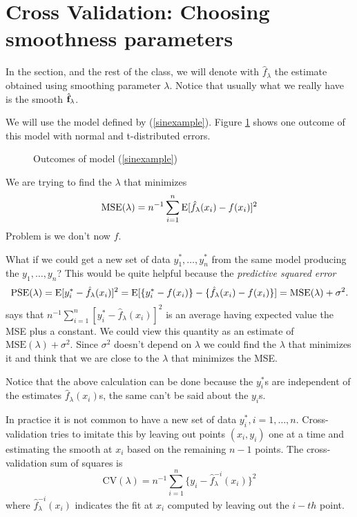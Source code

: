 \section{Cross Validation: Choosing smoothness parameters}
In the section, and the rest of the class, we will denote with
$\hat{f}_{\lambda}$ the
estimate obtained using smoothing parameter
$\lambda$. Notice that usually what we really have is the smooth
$\hat{{\mathbf f}}_{\lambda}$. 

We will use the model defined by (\ref{sinexample}). Figure \ref{f5.2.1}
shows one outcome of this model with normal and t-distributed errors.

\begin{figure}
\begin{center}
\end{center}
\caption{\label{f5.2.1} Outcomes of model (\ref{sinexample})}
\end{figure}

We are trying to find the $\lambda$ that minimizes 
\[
\mbox{MSE}(\lambda) = n^{-1} \sum_{i=1}^n \mbox{E} [ \hat{f}_{\lambda}(x_i) - f(x_i) ]^2
\]
Problem is we don't now $f$. 

What if we could get a new set of data $y^*_1,\dots,y^*_n$ from the
same model producing the $y_1,\dots,y_n$? This
would be quite helpful because the {\it predictive squared error} 
\[
\mbox{PSE}(\lambda)=\mbox{E}[ y^*_i - \hat{f}_{\lambda}(x_i) ]^2 = \mbox{E}[ \{y^*_i - f(x_i)\} -
\{\hat{f}_{\lambda}(x_i) - f(x_i)\} ] = \mbox{MSE}(\lambda) + \sigma^2.
\]
says that $n^{-1}\sum_{i=1}^n [ y^*_i - \hat{f}_{\lambda}(x_i) ]^2$ is 
an average  having
expected value the MSE plus a constant. We could view this quantity as
an estimate of $\mbox{MSE}(\lambda) + \sigma^2$. Since $\sigma^2$
doesn't depend on $\lambda$ we could find the $\lambda$ that minimizes
it and think that we are close to the 
$\lambda$ that minimizes the MSE. 

Notice that the above calculation can be done because the $y^*_i$s are
independent of the estimates 
$\hat{f}_{\lambda}(x_i)$s, the same can't be said about the $y_i$s. 

In practice it is not common to have a new set of data
$y_i^*,i=1,\dots,n$. Cross-validation tries to imitate this by
leaving out points
$(x_i,y_i)$ one at a time and estimating the smooth at $x_i$ based
on the remaining $n-1$ points. The cross-validation
sum of squares is
\[
\mbox{CV}(\lambda) = n^{-1} \sum_{i=1}^n \{ y_i -
\hat{f}_{\lambda}^{-i}(x_i) \}^2
\]
where $\hat{f}_{\lambda}^{-i}(x_i)$ indicates the fit at $x_i$
computed by leaving out the $i-th$ point. 

